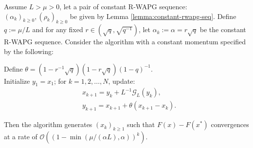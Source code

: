 \documentclass[12pt]{article}
\begin{document}
    \begin{theorem}\label{thm:fixed-momentum-fista}
        Assume $L > \mu > 0$, let a pair of constant R-WAPG sequence: $(\alpha_k)_{k \ge0}, (\rho_k)_{k \ge 0}$ be given by Lemma \ref{lemma:constant-rwapg-seq}.
        Define $q := \mu/L$ and for any fixed $r \in \left(\sqrt{q}, \sqrt{q^{-1}}\right)$, let $\alpha_k := \alpha = r \sqrt{q}$ be the constant R-WAPG sequence.
        Consider the algorithm with a constant momentum specified by the following:
        \begin{tcolorbox}
            Define $\theta = \left(1 - r^{-1}\sqrt{q}\right)(1 - r\sqrt{q})(1 - q)^{-1}$.
            \\
            Initialize $y_1 = x_1$; for $k = 1, 2, \ldots, N$, update:
            \begin{align*}
                &x_{k + 1} = y_k + L^{-1}\mathcal G_L (y_k)
                ,
                \\
                & y_{k + 1} = x_{k + 1} + \theta(x_{k + 1} - x_k).
            \end{align*}
        \end{tcolorbox}
        Then the algorithm generates $(x_k)_{k \ge 1}$ such that $F(x) - F(x^*)$ convergences at a rate of $\mathcal O\left(\left(1 - \min\left(\mu/(\alpha L), \alpha\right)\right)^k\right)$.
    \end{theorem}
\end{document}
